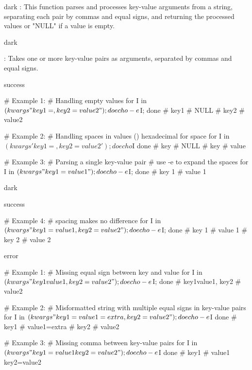 \label{kwargs}
\begin{baseBoxThree}{}{dark}
    \bigskip
    : This function parses and processes key-value arguments from a string, separating each pair by commas and equal signs, and returning the processed values or "NULL" if a value is empty.
    \bigskip
    \begin{baseBoxThree}{\fO}{dark}
        \smallskip
        \begin{posnexItemize}
            \item[\sA] \sV{*}: Takes one or more key-value pairs as arguments, separated by commas and equal signs.
        \end{posnexItemize}
        \smallskip
    \end{baseBoxThree}
    \smallskip
    \begin{baseBoxThree}{\fS}{success}
        \begin{posnex}
# Example 1: 
# Handling empty values
for I in $(kwargs "key1=,key2=value2"); do echo -e $I; done
# key1
# NULL
# key2
# value2

# Example 2:
# Handling spaces in values () hexadecimal for space
for I in $(kwargs 'key 1  =    , key 2 =  value 2'); do
    echo ${I}
done
# key
# NULL
# key
# value

# Example 3:
# Parsing a single key-value pair
# use -e to expand the spaces
for I in $(kwargs "key 1 = value 1"); do
    echo -e ${I};
done
# key 1
# value 1
        \end{posnex}
    \end{baseBoxThree}
    \smallskip
\end{baseBoxThree}
\begin{baseBoxThree}{}{dark}
    \begin{baseBoxThree}{\fS}{success}
\begin{posnex}
# Example 4: 
# spacing makes no difference
for I in $(kwargs "
key 1 =       value 1         ,
key 2            
    =             
        value 2
"); do
    echo -e ${I}; 
done
# key 1
# value 1
# key 2
# value 2
        \end{posnex}
    \end{baseBoxThree}
    \smallskip
    \begin{baseBoxThree}{\fX}{error}
        \begin{posnex}
# Example 1:
# Missing equal sign between key and value
for I in $(kwargs "key1value1, key2=value2"); do
    echo -e $I;
done
# key1value1, key2
# value2

# Example 2:
# Misformatted string with multiple equal signs in key-value pairs
for I in $(kwargs "key1=value1=extra, key2=value2"); do
    echo -e ${I}
done
# key1
# value1=extra
# key2
# value2

# Example 3:
# Missing comma between key-value pairs
for I in $(kwargs "key1=value1 key2=value2"); do 
    echo -e ${I}
done
# key1
# value1 key2=value2
        \end{posnex}
    \end{baseBoxThree}
    \smallskip
\end{baseBoxThree}
